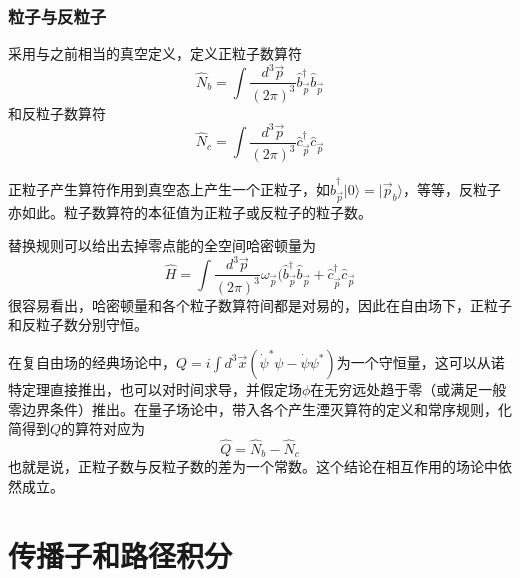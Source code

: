\documentclass[a4paper,11pt]{ctexart}
\newcommand{\beq}{\begin{equation}}
\newcommand{\eeq}{\end{equation}}
\begin{document}
\subsubsection{粒子与反粒子}
采用与之前相当的真空定义，定义正粒子数算符
\beq
\hat{N}_b = \int \frac{d^3 \vec{p}}{(2\pi)^3}   \hat{b}_{\vec{p}}^\dagger \hat{b}_{\vec{p}}
\eeq
和反粒子数算符
\beq
\hat{N}_c = \int \frac{d^3 \vec{p}}{(2\pi)^3} \hat{c}_{\vec{p}}^\dagger \hat{c}_{\vec{p}}
\eeq
\par
正粒子产生算符作用到真空态上产生一个正粒子，如$\hat{b}_{\vec{p}}^\dagger |0\rangle = |\vec{p}_b \rangle$，等等，反粒子亦如此。粒子数算符的本征值为正粒子或反粒子的粒子数。
\par
替换规则可以给出去掉零点能的全空间哈密顿量为
\beq \label{complexham}
\hat{H} = \int \frac{d^3 \vec{p}}{(2\pi)^3} \omega_{\vec{p}} (\hat{b}_{\vec{p}}^\dagger \hat{b}_{\vec{p}} +\hat{c}_{\vec{p}}^\dagger \hat{c}_{\vec{p}}
\eeq
很容易看出，哈密顿量和各个粒子数算符间都是对易的，因此在自由场下，正粒子和反粒子数分别守恒。
\par
在复自由场的经典场论中，$Q = i \int d^3 \vec{x} (\dot{\psi}^* \psi - \dot{\psi} \psi^*)$为一个守恒量，这可以从诺特定理直接推出，也可以对时间求导，并假定场$\phi$在无穷远处趋于零（或满足一般零边界条件）推出。在量子场论中，带入各个产生湮灭算符的定义和常序规则，化简得到$Q$的算符对应为
\beq
\hat{Q} = \hat{N}_b - \hat{N}_c
\eeq
也就是说，正粒子数与反粒子数的差为一个常数。这个结论在相互作用的场论中依然成立。

\section{传播子和路径积分}
\end{document}
